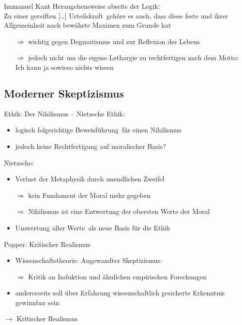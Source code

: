 \documentclass[12pt]{beamer}
\begin{document}
\begin{frame}{Immanuel Kant}
Herangehensweise abseits der Logik:\\
Zu einer  \glqq gereiften [\ldots] Urteilskraft\grqq\ gehöre es auch, dass diese \glqq feste und ihrer Allgemeinheit nach bewährte Maximen zum Grunde hat\grqq\ \cite{kritik}
\begin{itemize}
\item[$\Rightarrow$] wichtig gegen Dogmatismus und zur Reflexion des Lebens
\item[$\Rightarrow$] jedoch nicht um die eigene Lethargie zu rechtfertigen nach dem Motto:\\
\glqq Ich kann ja sowieso nichts wissen\grqq
\end{itemize}
\end{frame}

\subsection{Moderner Skeptizismus}
\begin{frame}{Ethik: Der Nihilismus – Nietzsche}
Ethik:\\
\begin{itemize}
\item logisch folgerichtige \glqq Beweisführung\grqq\ für einen Nihilismus
\item jedoch keine Rechtfertigung auf moralischer Basis?
\end{itemize}
Nietzsche:\\
\begin{itemize}
\item Verlust der Metaphysik durch unendlichen Zweifel
\item[$\Rightarrow$] kein Fundament der Moral mehr gegeben
\item[$\Rightarrow$] Nihilismus ist eine Entwertung der obersten Werte der Moral
\item \glqq Umwertung aller Werte\grqq\ als neue Basis für die Ethik
\end{itemize}
\end{frame}


\begin{frame}{Popper: Kritischer Realismus}
\begin{itemize}
\item Wissenschaftstheorie: Angewandter Skeptizismus:
\item[$\Rightarrow$] Kritik an Induktion und ähnlichen empirischen Forschungen
\item andererseits soll über Erfahrung wissenschaftlich gesicherte Erkenntnis gewinnbar sein
\end{itemize}
$\rightarrow$ \glqq Kritischer Realismus\grqq
\end{frame}
\end{document}
